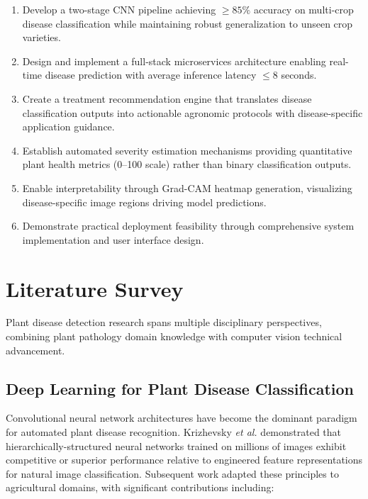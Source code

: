 \documentclass[conference]{IEEEtran}
\begin{document}
\begin{enumerate}
\item Develop a two-stage CNN pipeline achieving $\geq 85\%$ accuracy on multi-crop disease classification while maintaining robust generalization to unseen crop varieties.

\item Design and implement a full-stack microservices architecture enabling real-time disease prediction with average inference latency $\leq 8$ seconds.

\item Create a treatment recommendation engine that translates disease classification outputs into actionable agronomic protocols with disease-specific application guidance.

\item Establish automated severity estimation mechanisms providing quantitative plant health metrics (0--100 scale) rather than binary classification outputs.

\item Enable interpretability through Grad-CAM heatmap generation, visualizing disease-specific image regions driving model predictions.

\item Demonstrate practical deployment feasibility through comprehensive system implementation and user interface design.
\end{enumerate}

\section{Literature Survey}
\label{sec:literature}

Plant disease detection research spans multiple disciplinary perspectives, combining plant pathology domain knowledge with computer vision technical advancement.

\subsection{Deep Learning for Plant Disease Classification}

Convolutional neural network architectures have become the dominant paradigm for automated plant disease recognition. Krizhevsky \textit{et al.} \cite{ref02} demonstrated that hierarchically-structured neural networks trained on millions of images exhibit competitive or superior performance relative to engineered feature representations for natural image classification. Subsequent work adapted these principles to agricultural domains, with significant contributions including:
\end{document}
